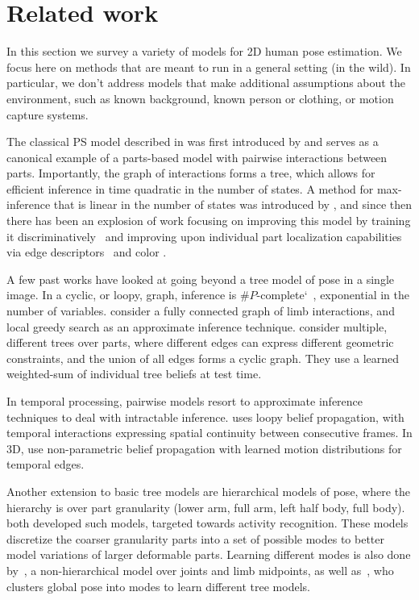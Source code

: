 \chapter{Related work}

In this section we survey a variety of models for 2D human pose estimation.  We 
focus here on methods that are meant to run in a general setting (\ie in the 
wild).  In particular, we don't address models that make additional assumptions 
about the environment, such as known background, known person or clothing, or 
motion capture systems.


 The classical PS model described in  was first 
introduced by \citet{fischler1973ps} and serves as a canonical example of a 
parts-based model with pairwise interactions between parts.  Importantly, the 
graph of interactions forms a tree, which allows for efficient inference in 
time quadratic in the number of states.  A method for max-inference that is 
linear in the number of states was introduced by \citet{felzps}, and since then 
there has been an explosion of work focusing on improving this model by 
training it discriminatively~\citep{devacrf,andriluka09} and improving upon 
individual part localization capabilities via edge 
descriptors~\citep{andriluka} and color \citep{eichner09}.

A few past works have looked at going beyond a tree model of pose in a single 
image.  In a cyclic, or loopy, graph, inference is 
$\#P$-complete`~\citep{koller-book}, exponential in the number of variables.  
\citet{ddtran} consider a fully connected graph of limb interactions, and local 
greedy search as an approximate inference technique. \citet{wang2008multiple} 
consider multiple, different trees over parts, where different edges can 
express different geometric constraints, and the union of all edges forms a 
cyclic graph.  They use a learned weighted-sum of individual tree beliefs at 
test time.

In temporal processing, pairwise models resort to approximate inference 
techniques to deal with intractable inference.  \citet{ferrari09} uses loopy 
belief propagation, with temporal interactions expressing spatial continuity 
between consecutive frames.  In 3D, \citet{sigal2004tracking} use 
non-parametric belief propagation with learned motion distributions for 
temporal edges.

Another extension to basic tree models are hierarchical models of pose, where 
the hierarchy is over part granularity (\eg lower arm, full arm, left half 
body, full body). \citet{wang2011,sun2011} both developed such models, targeted 
towards activity recognition.  These models discretize the coarser granularity 
parts into a set of possible modes to better model variations of larger 
deformable parts.  Learning different modes is also done by~\citet{deva2011}, a 
non-hierarchical model over joints and limb midpoints, as well 
as~\citet{everingham2011}, who clusters global pose into modes to learn 
different tree models.

